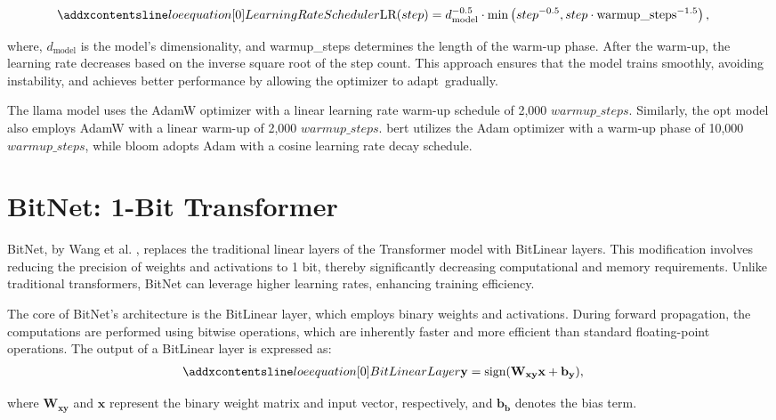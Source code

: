\begin{align}
\setequationentry{Learning Rate Scheduler}
    \text{LR}(step) &= d_{\text{model}}^{-0.5} \cdot \min\left(step^{-0.5}, step \cdot \text{warmup\_steps}^{-1.5}\right),
\end{align}

where, $d_{\text{model}}$ is the model’s dimensionality, and warmup\_steps determines the length of the warm-up phase. After the warm-up, the learning rate decreases based on the inverse square root of the step count. This approach ensures that the model trains smoothly, avoiding instability, and achieves better performance by allowing the optimizer to adapt~gradually.

The \gls{llama} \cite{llama} model uses the AdamW optimizer with a linear learning rate warm-up schedule of 2,000 \(warmup\_steps\). Similarly, the \gls{opt} \cite{opt} model also employs AdamW with a linear warm-up of 2,000 \(warmup\_steps\). \gls{bert} \cite{bert} utilizes the Adam optimizer with a warm-up phase of 10,000 \(warmup\_steps\), while \gls{bloom} \cite{bloom} adopts Adam with a cosine learning rate decay schedule.


\section{BitNet: 1-Bit Transformer}
\label{sect:bitnet}

BitNet, by Wang et al. \cite{BitNet2023}, replaces the traditional linear layers of the Transformer model with BitLinear layers. This modification involves reducing the precision of weights and activations to 1 bit, thereby significantly decreasing computational and memory requirements. Unlike traditional transformers, BitNet can leverage higher learning rates, enhancing training efficiency.

The core of BitNet's architecture is the BitLinear layer, which employs binary weights and activations. During forward propagation, the computations are performed using bitwise operations, which are inherently faster and more efficient than standard floating-point operations. The output of a BitLinear layer is expressed as:
\begin{align}
\setequationentry{Bit Linear Layer}
    \mathbf{y} &= \text{sign}(\mathbf{W_{xy}}\mathbf{x} + \mathbf{b_y}),
\end{align}

where \(\mathbf{W_{xy}}\) and \(\mathbf{x}\) represent the binary weight matrix and input vector, respectively, and \(\mathbf{b_b}\) denotes the bias term.

